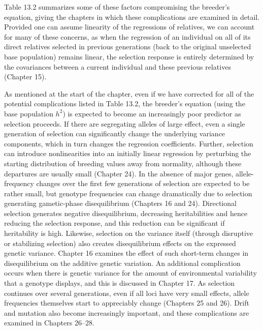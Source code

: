 \documentclass{article}
\begin{document}
Table 13.2 summarizes some of these factors compromising the breeder's equation, giving the chapters in which these complications are examined in detail. Provided one can assume linearity of the regressions of relatives, we can account for many of these concerns, as when the regression of an individual on all of its direct relatives selected in previous generations (back to the original unselected base population) remains linear, the selection response is entirely determined by the covariances between a current individual and these previous relatives (Chapter 15).

As mentioned at the start of the chapter, even if we have corrected for all of the potential complications listed in Table 13.2, the breeder's equation (using the base population  $ h^{2} $) is expected to become an increasingly poor predictor as selection proceeds. If there are segregating alleles of large effect, even a single generation of selection can significantly change the underlying variance components, which in turn changes the regression coefficients. Further, selection can introduce nonlinearities into an initially linear regression by perturbing the starting distribution of breeding values away from normality, although these departures are usually small (Chapter 24). In the absence of major genes, allele-frequency changes over the first few generations of selection are expected to be rather small, but genotype frequencies can change dramatically due to selection generating gametic-phase disequilibrium (Chapters 16 and 24). Directional selection generates negative disequilibrium, decreasing heritabilities and hence reducing the selection response, and this reduction can be significant if heritability is high. Likewise, selection on the variance itself (through disruptive or stabilizing selection) also creates disequilibrium effects on the expressed genetic variance. Chapter 16 examines the effect of such short-term changes in disequilibrium on the additive genetic variation. An additional complication occurs when there is genetic variance for the amount of environmental variability that a genotype displays, and this is discussed in Chapter 17. As selection continues over several generations, even if all loci have very small effects, allele frequencies themselves start to appreciably change (Chapters 25 and 26). Drift and mutation also become increasingly important, and these complications are examined in Chapters 26–28.
\end{document}
